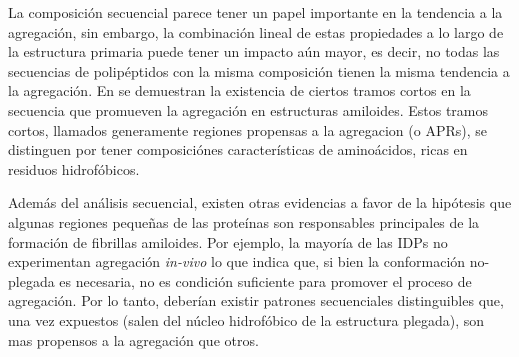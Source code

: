 La composición secuencial parece tener un papel importante en la tendencia a la agregación, sin embargo, la combinación lineal de estas propiedades a lo largo de la estructura
primaria puede tener un impacto aún mayor, es decir, no todas las secuencias de polipéptidos con la misma composición tienen la misma tendencia a la agregación.
En \cite{ventura2004short} se demuestran la existencia de ciertos tramos cortos en la secuencia que promueven la agregación en estructuras amiloides.
Estos tramos cortos, llamados generamente regiones propensas a la agregacion (o APRs), se distinguen por tener composiciónes características de aminoácidos, ricas en residuos hidrofóbicos.

Además del análisis secuencial, existen otras evidencias a favor de la hipótesis que algunas regiones pequeñas de las proteínas son responsables principales de la formación de fibrillas amiloides. 
Por ejemplo, la mayoría de las IDPs no experimentan agregación \textit{in-vivo} \cite{linding2004comparative} lo que indica que, si bien la conformación no-plegada es necesaria, no es condición suficiente 
para promover el proceso de agregación.
Por lo tanto, deberían existir patrones secuenciales distinguibles que, una vez expuestos (salen del núcleo hidrofóbico de la estructura plegada), son mas propensos a la agregación que otros.  



% 
% 





